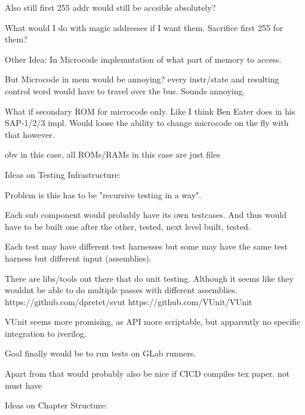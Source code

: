 Also still first 255 addr would still be accsible absolutely?

What would I do with magic addresses if I want them. Sacrifice first 255 for them?

Other Idea: In Microcode implemntation of what part of memory to access. 

But Microcode in mem would be annoying? every instr/state and resulting control word would have to travel over the bus. Sounds annoying. 

What if secondary ROM for microcode only. Like I think Ben Eater does in his SAP-1/2/3 impl.
Would loose the ability to change microcode on the fly with that however. 

obv in this case, all ROMs/RAMs in this case are just files


Ideas on Testing Infrastructure:

Problem is this has to be "recursive testing in a way". 

Each sub component would probably have its own testcases. And thus would have to be built one after the other, tested, next level built, tested. 

Each test may have different test harnesses but some may have the same test harness but different input (assemblies). 


There are libs/tools out there that do unit testing. Although it seems like they wouldnt be able to do multiple passes with different assemblies. https://github.com/dpretet/svut https://github.com/VUnit/VUnit

VUnit seems more promising, as API more scriptable, but apparently no specific integration to iverilog.

Goal finally would be to run tests on GLab runners. 



Apart from that would probably also be nice if CICD compiles tex paper. not must have




Ideas on Chapter Structure:



